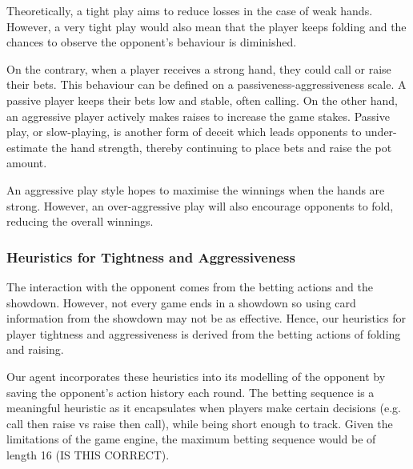 \documentclass{article}
\begin{document}
Theoretically, a tight play aims to reduce losses in the case of weak hands. However, a very tight play would also mean that the player keeps folding and the chances to observe the opponent's behaviour is diminished.

On the contrary, when a player receives a strong hand, they could call or raise their bets. This behaviour can be defined on a passiveness-aggressiveness scale. A passive player keeps their bets low and stable, often calling. On the other hand, an aggressive player actively makes raises to increase the game stakes. Passive play, or slow-playing, is another form of deceit which leads opponents to under-estimate the hand strength, thereby continuing to place bets and raise the pot amount.

An aggressive play style hopes to maximise the winnings when the hands are strong. However, an over-aggressive play will also encourage opponents to fold, reducing the overall winnings.


\subsubsection{Heuristics for Tightness and Aggressiveness}
The interaction with the opponent comes from the betting actions and the showdown. However, not every game ends in a showdown so using card information from the showdown may not be as effective. Hence, our heuristics for player tightness and aggressiveness is derived from the betting actions of folding and raising.


Our agent incorporates these heuristics into its modelling of the opponent by saving the opponent's action history each round. The betting sequence is a meaningful heuristic as it encapsulates when players make certain decisions (e.g. call then raise vs raise then call), while being short enough to track. Given the limitations of the game engine, the maximum betting sequence would be of length 16 (IS THIS CORRECT). 
\end{document}
